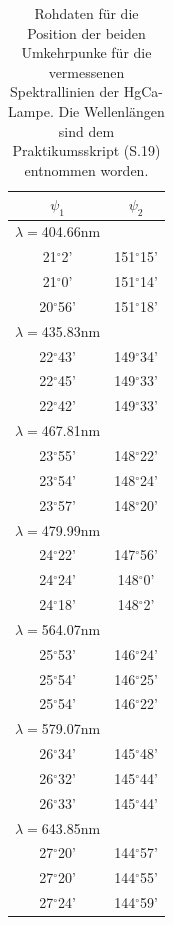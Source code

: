 \documentclass[12pt,a4paper]{article}
\begin{document}
	\begin{table}
		\begin{center}
			\begin{tabular}{|c|c|}
				\hline
				$\psi_1$ & $\psi_2$ \\
				\hline
				$\lambda =$404.66nm & \\
				\hline
				21$^{\circ}$2' &151$^{\circ}$15' \\
				\hline
				21$^{\circ}$0' &151$^{\circ}$14' \\
				\hline
				20$^{\circ}$56' &151$^{\circ}$18' \\ 
				\hline
				$\lambda =$435.83nm & \\
				\hline
				22$^{\circ}$43' &149$^{\circ}$34' \\
				\hline
				22$^{\circ}$45' &149$^{\circ}$33' \\ 
				\hline
				22$^{\circ}$42' &149$^{\circ}$33' \\ 
				\hline
				$\lambda =$467.81nm & \\
				\hline
				23$^{\circ}$55' &148$^{\circ}$22' \\
				\hline
				23$^{\circ}$54' &148$^{\circ}$24' \\
				\hline
				23$^{\circ}$57' &148$^{\circ}$20' \\ 
				\hline
				$\lambda =$479.99nm & \\
				\hline
				24$^{\circ}$22' &147$^{\circ}$56' \\ 
				\hline
				24$^{\circ}$24' &148$^{\circ}$0' \\ 
				\hline
				24$^{\circ}$18' &148$^{\circ}$2' \\ 
				\hline
				$\lambda =$564.07nm & \\
				\hline
				25$^{\circ}$53' &146$^{\circ}$24' \\
				\hline
				25$^{\circ}$54' &146$^{\circ}$25' \\
				\hline
				25$^{\circ}$54' &146$^{\circ}$22' \\ 
				\hline
				$\lambda =$579.07nm & \\
				\hline
				26$^{\circ}$34' &145$^{\circ}$48' \\
				\hline
				26$^{\circ}$32' &145$^{\circ}$44' \\
				\hline
				26$^{\circ}$33' &145$^{\circ}$44' \\ 
				\hline
				$\lambda =$643.85nm & \\
				\hline
				27$^{\circ}$20' &144$^{\circ}$57' \\
				\hline
				27$^{\circ}$20' &144$^{\circ}$55' \\
				\hline
				27$^{\circ}$24' &144$^{\circ}$59' \\
				\hline
			\end{tabular}
			\caption{Rohdaten für die Position der beiden Umkehrpunke für die vermessenen Spektrallinien der HgCa-Lampe. Die Wellenlängen sind dem Praktikumsskript (S.19) entnommen worden.}
			\label{tab:RohdatenDispersion}
		\end{center}
	\end{table}
	
\end{document}
